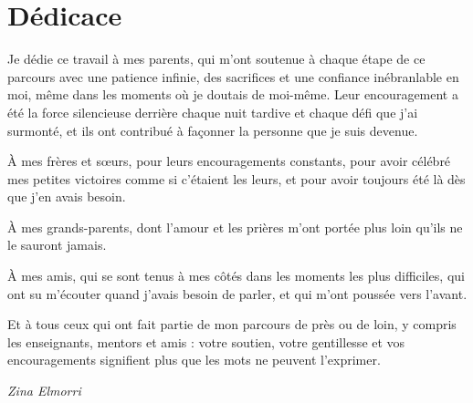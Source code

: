 \chapter*{Dédicace}

Je dédie ce travail à mes parents, qui m'ont soutenue à chaque étape de ce parcours avec une patience infinie, des sacrifices et une confiance inébranlable en moi, même dans les moments où je doutais de moi-même. Leur encouragement a été la force silencieuse derrière chaque nuit tardive et chaque défi que j'ai surmonté, et ils ont contribué à façonner la personne que je suis devenue.

À mes frères et s\oe urs, pour leurs encouragements constants, pour avoir célébré mes petites victoires comme si c'étaient les leurs, et pour avoir toujours été là dès que j'en avais besoin.

À mes grands-parents, dont l'amour et les prières m'ont portée plus loin qu'ils ne le sauront jamais.

À mes amis, qui se sont tenus à mes côtés dans les moments les plus difficiles, qui ont su m'écouter quand j'avais besoin de parler, et qui m'ont poussée vers l'avant.

Et à tous ceux qui ont fait partie de mon parcours de près ou de loin, y compris les enseignants, mentors et amis : votre soutien, votre gentillesse et vos encouragements signifient plus que les mots ne peuvent l'exprimer.

\vspace{1.5cm}
\begin{flushright}
    \textit{Zina Elmorri}
\end{flushright}

\clearpage
